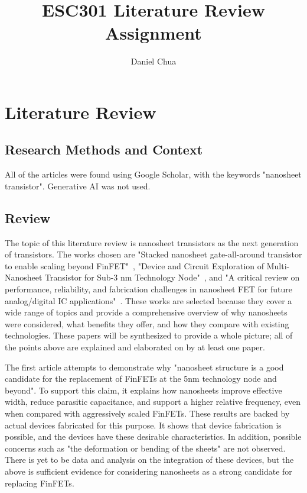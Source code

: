 \documentclass[12pt]{article}
\author{Daniel Chua}
\title{ESC301 Literature Review Assignment}
\begin{document}
\maketitle

\section{Literature Review}

\subsection{Research Methods and Context}

All of the articles were found using Google Scholar, with the keywords "nanosheet transistor". Generative AI was not used.

\subsection{Review}

The topic of this literature review is nanosheet transistors as the next generation of transistors. The works chosen are "Stacked nanosheet gate-all-around transistor to enable scaling beyond FinFET"~\cite{nanosheet}, "Device and Circuit Exploration of Multi-Nanosheet Transistor for Sub-3 nm Technology Node"~\cite{3nm}, and "A critical review on performance, reliability, and fabrication challenges in nanosheet FET for future analog/digital IC applications"~\cite{review}. These works are selected because they cover a wide range of topics and provide a comprehensive overview of why nanosheets were considered, what benefits they offer, and how they compare with existing technologies. These papers will be synthesized to provide a whole picture; all of the points above are explained and elaborated on by at least one paper.

The first article attempts to demonstrate why "nanosheet structure is a good candidate for the replacement of FinFETs at the 5nm technology node and beyond". To support this claim, it explains how nanosheets improve effective width, reduce parasitic capacitance, and support a higher relative frequency, even when compared with aggressively scaled FinFETs. These results are backed by actual devices fabricated for this purpose. It shows that device fabrication is possible, and the devices have these desirable characteristics. In addition, possible concerns such as "the deformation or bending of the sheets" are not observed. There is yet to be data and analysis on the integration of these devices, but the above is sufficient evidence for considering nanosheets as a strong candidate for replacing FinFETs.
\end{document}
